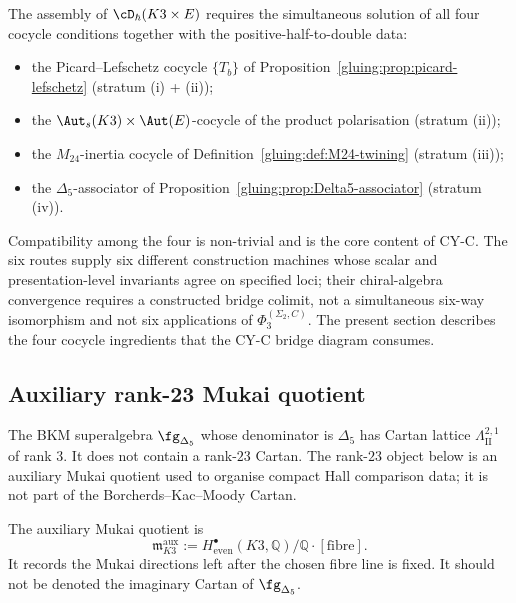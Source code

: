 \begin{remark}
\label{gluing:rem:four-cocycles-one-hopf}
The assembly of $\cD_\hbar(K3 \times E)$ requires the simultaneous
solution of all four cocycle conditions together with the
positive-half-to-double data:
\begin{itemize}
 \item the Picard--Lefschetz cocycle $\{T_b\}$ of
 Proposition~\ref{gluing:prop:picard-lefschetz} (stratum (i) + (ii));
 \item the $\Aut_s(K3) \times \Aut(E)$-cocycle of the product
 polarisation (stratum (ii));
 \item the $M_{24}$-inertia cocycle of
 Definition~\ref{gluing:def:M24-twining} (stratum (iii));
 \item the $\Delta_5$-associator of Proposition~\ref{gluing:prop:Delta5-associator}
 (stratum (iv)).
\end{itemize}
Compatibility among the four is non-trivial and is the core content of
CY-C. The six routes supply six different construction machines whose
scalar and presentation-level invariants agree on specified loci; their
chiral-algebra convergence requires a constructed bridge colimit,
not a simultaneous six-way isomorphism and not six applications of
\(\Phi_3^{(\Sigma_2, C)}\). The present section describes the four
cocycle ingredients that the CY-C bridge diagram consumes.
\end{remark}

\subsection{Auxiliary rank-23 Mukai quotient}
\label{gluing:sec:k3xe-imaginary-cartan}

The BKM superalgebra $\fg_{\Delta_5}$ whose denominator is $\Delta_5$
has Cartan lattice \(\Lambda^{2,1}_{\mathrm{II}}\) of rank \(3\). It
does not contain a rank-\(23\) Cartan. The rank-\(23\) object below is
an auxiliary Mukai quotient used to organise compact Hall comparison
data; it is not part of the Borcherds--Kac--Moody Cartan.

\begin{definition}
\label{gluing:def:imaginary-cartan}
The auxiliary Mukai quotient is
\[
 \mathfrak m_{K3}^{\mathrm{aux}}
 :=H^\bullet_{\mathrm{even}}(K3,\mathbb Q)/
 \mathbb Q\cdot[\mathrm{fibre}].
\]
It records the Mukai directions left after the chosen fibre line is
fixed. It should not be denoted the imaginary Cartan of
\(\fg_{\Delta_5}\).
\end{definition}

